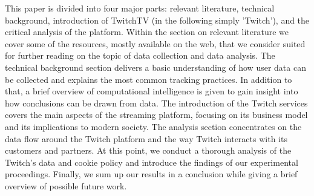 This paper is divided into four major parts: relevant literature, technical background, introduction of TwitchTV (in the following simply 'Twitch'), and the critical analysis of the platform.
Within the section on relevant literature we cover some of the resources, mostly available on the web, that we consider suited for further reading on the topic of data collection and data analysis. 
The technical background section delivers a basic understanding of how user data can be collected and explains the most common tracking practices. 
In addition to that, a brief overview of computational intelligence is given to gain insight into how conclusions can be drawn from data. 
The introduction of the Twitch services covers the main aspects of the streaming platform, focusing on its business model and its implications to modern society.  
The analysis section concentrates on the data flow around the Twitch platform and the way Twitch interacts with its customers and partners. 
At this point, we conduct a thorough analysis of the Twitch's data and cookie policy and introduce the findings of our experimental proceedings. 
Finally, we sum up our results in a conclusion while giving a brief overview of possible future work. 
